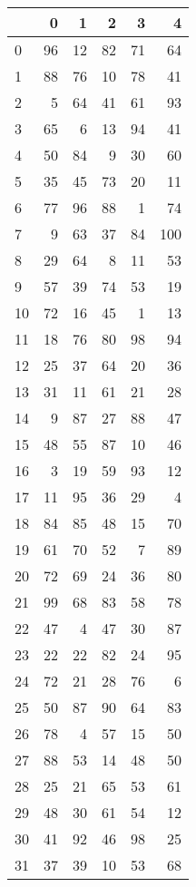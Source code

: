 \begin{tabular}{lrrrrr}
\toprule
{} &    0 &   1 &   2 &   3 &    4 \\
\midrule
0  &   96 &  12 &  82 &  71 &   64 \\
1  &   88 &  76 &  10 &  78 &   41 \\
2  &    5 &  64 &  41 &  61 &   93 \\
3  &   65 &   6 &  13 &  94 &   41 \\
4  &   50 &  84 &   9 &  30 &   60 \\
5  &   35 &  45 &  73 &  20 &   11 \\
6  &   77 &  96 &  88 &   1 &   74 \\
7  &    9 &  63 &  37 &  84 &  100 \\
8  &   29 &  64 &   8 &  11 &   53 \\
9  &   57 &  39 &  74 &  53 &   19 \\
10 &   72 &  16 &  45 &   1 &   13 \\
11 &   18 &  76 &  80 &  98 &   94 \\
12 &   25 &  37 &  64 &  20 &   36 \\
13 &   31 &  11 &  61 &  21 &   28 \\
14 &    9 &  87 &  27 &  88 &   47 \\
15 &   48 &  55 &  87 &  10 &   46 \\
16 &    3 &  19 &  59 &  93 &   12 \\
17 &   11 &  95 &  36 &  29 &    4 \\
18 &   84 &  85 &  48 &  15 &   70 \\
19 &   61 &  70 &  52 &   7 &   89 \\
20 &   72 &  69 &  24 &  36 &   80 \\
21 &   99 &  68 &  83 &  58 &   78 \\
22 &   47 &   4 &  47 &  30 &   87 \\
23 &   22 &  22 &  82 &  24 &   95 \\
24 &   72 &  21 &  28 &  76 &    6 \\
25 &   50 &  87 &  90 &  64 &   83 \\
26 &   78 &   4 &  57 &  15 &   50 \\
27 &   88 &  53 &  14 &  48 &   50 \\
28 &   25 &  21 &  65 &  53 &   61 \\
29 &   48 &  30 &  61 &  54 &   12 \\
30 &   41 &  92 &  46 &  98 &   25 \\
31 &   37 &  39 &  10 &  53 &   68 \\

\end{tabular}

